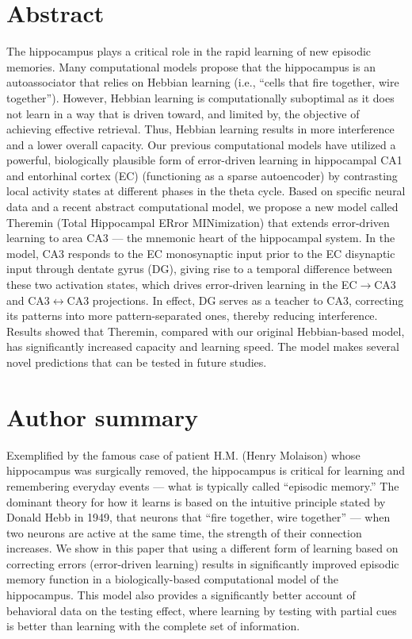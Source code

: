 \documentclass[10pt,letterpaper]{article}
\begin{document}
\section*{Abstract}
The hippocampus plays a critical role in the rapid learning of new episodic memories. Many computational models propose that the hippocampus is an autoassociator that relies on Hebbian learning (i.e., ``cells that fire together, wire together''). However, Hebbian learning is computationally suboptimal as it does not learn in a way that is driven toward, and limited by, the objective of achieving effective retrieval.  Thus, Hebbian learning results in more interference and a lower  overall capacity.  Our previous computational models have utilized a powerful, biologically plausible form of error-driven learning in hippocampal CA1 and entorhinal cortex (EC) (functioning as a sparse autoencoder) by contrasting local activity states at different phases in the theta cycle. Based on specific neural data and a recent abstract computational model, we propose a new model called Theremin (Total Hippocampal ERror MINimization) that extends error-driven learning to area CA3 --- the mnemonic heart of the hippocampal system. In the model, CA3 responds to the EC monosynaptic input prior to the EC disynaptic input through dentate gyrus (DG), giving rise to a temporal difference between these two activation states, which drives error-driven learning in the EC$\rightarrow$CA3 and CA3$\leftrightarrow$CA3 projections.  In effect, DG serves as a teacher to CA3, correcting its patterns into more pattern-separated ones, thereby reducing interference. Results showed that Theremin, compared with our original Hebbian-based model, has significantly increased capacity and learning speed.  The model makes several novel predictions that can be tested in future studies.


\section*{Author summary}
Exemplified by the famous case of patient H.M. (Henry Molaison) whose hippocampus was surgically removed, the hippocampus is critical for learning and remembering everyday events --- what is typically called ``episodic memory.''  The dominant theory for how it learns is based on the intuitive principle stated by Donald Hebb in 1949, that neurons that ``fire together, wire together'' --- when two neurons are active at the same time, the strength of their connection increases.  We show in this paper that using a different form of learning based on correcting errors (error-driven learning) results in significantly improved episodic memory function in a biologically-based computational model of the hippocampus.  This model also provides a significantly better account of behavioral data on the testing effect, where learning by testing with partial cues is better than learning with the complete set of information.
\end{document}

